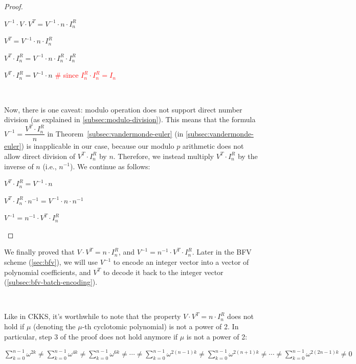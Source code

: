 \begin{proof}
\begin{enumerate}
$V^{-1} \cdot V \cdot V^T = V^{-1} \cdot n \cdot I_n^R$

$V^T = V^{-1} \cdot n \cdot I_n^R$

$V^T \cdot I_n^R = V^{-1} \cdot n \cdot I_n^R  \cdot I_n^R$

$V^T \cdot I_n^R = V^{-1} \cdot n$ \textcolor{red}{\text{ } \# since $I_n^R  \cdot I_n^R = I_n$}

$ $

Now, there is one caveat: modulo operation does not support direct number division (as explained in \autoref{subsec:modulo-division}). This means that the formula $V^{-1} = \dfrac{V^T \cdot I_n^R}{n}$ in Theorem~\ref*{subsec:vandermonde-euler} (in \autoref{subsec:vandermonde-euler}) is inapplicable in our case, because our modulo $p$ arithmetic does not allow direct division of $V^T \cdot I_n^R$ by $n$. Therefore, we instead multiply $V^T \cdot I_n^R$ by the inverse of $n$ (i.e., $n^{-1}$). We continue as follows:

$V^T \cdot I_n^R = V^{-1} \cdot n$

$V^T \cdot I_n^R \cdot n^{-1}= V^{-1} \cdot n \cdot n^{-1}$

$V^{-1} = n^{-1}\cdot V^T \cdot I_n^R$

\end{enumerate}
\end{proof}

We finally proved that $V\cdot V^T = n \cdot I_n^R$, and $V^{-1} = n^{-1}\cdot V^T \cdot I_n^R$. Later in the BFV scheme (\autoref{sec:bfv}), we will use $V^{-1}$ to encode an integer vector into a vector of polynomial coefficients, and $V^T$ to decode it back to the integer vector (\autoref{subsec:bfv-batch-encoding}).

$ $

 Like in CKKS, it's worthwhile to note that the property $V\cdot V^T = n\cdot I_n^R$ does not hold if $\mu$ (denoting the $\mu$-th cyclotomic polynomial) is not a power of 2. In particular, step 3 of the proof does not hold anymore if $\mu$ is not a power of 2:

$\sum\limits_{k=0}^{n-1} \omega^{2k} \neq \sum\limits_{k=0}^{n-1} \omega^{4k} \neq \sum\limits_{k=0}^{n-1} \omega^{6k} \neq \cdots \neq \sum\limits_{k=0}^{n-1} \omega^{2(n-1)k} \neq \sum\limits_{k=0}^{n-1} \omega^{2(n+1)k} \neq \cdots \neq \sum\limits_{k=0}^{n-1} \omega^{2(2n-1)k} \neq 0$